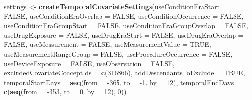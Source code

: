 \documentclass[
]{article}
\newenvironment{Shaded}{\begin{snugshade}}{\end{snugshade}}
\newcommand{\DataTypeTok}[1]{\textcolor[rgb]{0.13,0.29,0.53}{#1}}
\newcommand{\DecValTok}[1]{\textcolor[rgb]{0.00,0.00,0.81}{#1}}
\newcommand{\KeywordTok}[1]{\textcolor[rgb]{0.13,0.29,0.53}{\textbf{#1}}}
\newcommand{\NormalTok}[1]{#1}
\newcommand{\OtherTok}[1]{\textcolor[rgb]{0.56,0.35,0.01}{#1}}
\newcommand{\StringTok}[1]{\textcolor[rgb]{0.31,0.60,0.02}{#1}}
\begin{document}
\begin{Shaded}
\begin{Highlighting}[]
\NormalTok{settings <-}\StringTok{ }\KeywordTok{createTemporalCovariateSettings}\NormalTok{(}\DataTypeTok{useConditionEraStart =} \OtherTok{FALSE}\NormalTok{,}
                                            \DataTypeTok{useConditionEraOverlap =} \OtherTok{FALSE}\NormalTok{,}
                                            \DataTypeTok{useConditionOccurrence =} \OtherTok{FALSE}\NormalTok{,}
                                            \DataTypeTok{useConditionEraGroupStart =} \OtherTok{FALSE}\NormalTok{,}
                                            \DataTypeTok{useConditionEraGroupOverlap =} \OtherTok{FALSE}\NormalTok{,}
                                            \DataTypeTok{useDrugExposure =} \OtherTok{FALSE}\NormalTok{,}
                                            \DataTypeTok{useDrugEraStart =} \OtherTok{FALSE}\NormalTok{,}
                                            \DataTypeTok{useDrugEraOverlap =} \OtherTok{FALSE}\NormalTok{,}
                                            \DataTypeTok{useMeasurement =} \OtherTok{FALSE}\NormalTok{,}
                                            \DataTypeTok{useMeasurementValue =} \OtherTok{TRUE}\NormalTok{,}
                                            \DataTypeTok{useMeasurementRangeGroup =} \OtherTok{FALSE}\NormalTok{,}
                                            \DataTypeTok{useProcedureOccurrence =} \OtherTok{FALSE}\NormalTok{,}
                                            \DataTypeTok{useDeviceExposure =} \OtherTok{FALSE}\NormalTok{,}
                                            \DataTypeTok{useObservation =} \OtherTok{FALSE}\NormalTok{,}
                                            \DataTypeTok{excludedCovariateConceptIds =} \KeywordTok{c}\NormalTok{(}\DecValTok{316866}\NormalTok{),}
                                            \DataTypeTok{addDescendantsToExclude =} \OtherTok{TRUE}\NormalTok{,}
                                            \DataTypeTok{temporalStartDays =} \KeywordTok{seq}\NormalTok{(}\DataTypeTok{from =} \DecValTok{-365}\NormalTok{, }
                                                                    \DataTypeTok{to =} \DecValTok{-1}\NormalTok{, }\DataTypeTok{by =} \DecValTok{12}\NormalTok{), }
                                            \DataTypeTok{temporalEndDays =} \KeywordTok{c}\NormalTok{(}\KeywordTok{seq}\NormalTok{(}\DataTypeTok{from =} \DecValTok{-353}\NormalTok{, }
                                                                    \DataTypeTok{to =} \DecValTok{0}\NormalTok{, }\DataTypeTok{by =} \DecValTok{12}\NormalTok{), }\DecValTok{0}\NormalTok{))}


\end{Highlighting}
\end{Shaded}
\end{document}
